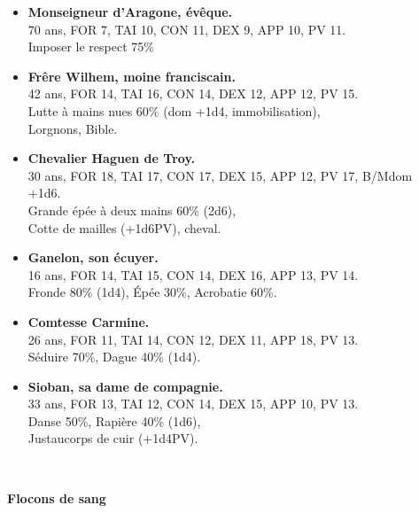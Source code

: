 \documentclass[11pt,twoside,a4paper]{book}
\begin{document}
\setlength\parindent{20pt}
\begin{itemize}
	\item \textbf{Monseigneur d'Aragone, {\'e}v{\^e}que.}~\\
		70 ans, FOR 7, TAI 10, CON 11, DEX 9, APP 10, PV 11.~\\
		Imposer le respect 75\%
	\item \textbf{Fr{\^e}re Wilhem, moine franciscain.}~\\
		42 ans, FOR 14, TAI 16, CON 14, DEX 12, APP 12, PV 15.~\\
		Lutte {\`a} mains nues 60\% (dom +1d4, immobilisation),~\\
		Lorgnons, Bible.
	\item \textbf{Chevalier Haguen de Troy.}~\\
		30 ans, FOR 18, TAI 17, CON 17, DEX 15, APP 12, PV 17, B/Mdom +1d6.~\\
		Grande {\'e}p{\'e}e {\`a} deux mains 60\% (2d6),~\\
		Cotte de mailles (+1d6PV), cheval.
	\item \textbf{Ganelon, son {\'e}cuyer.}~\\
		16 ans, FOR 14, TAI 15, CON 14, DEX 16, APP 13, PV 14.~\\
		Fronde 80\% (1d4), {\'E}p{\'e}e 30\%, Acrobatie 60\%. 
	\item \textbf{Comtesse Carmine.}~\\
		26 ans, FOR 11, TAI 14, CON 12, DEX 11, APP 18, PV 13.~\\
		S{\'e}duire 70\%, Dague 40\% (1d4).
	\item \textbf{Sioban, sa dame de compagnie.}~\\
		33 ans, FOR 13, TAI 12, CON 14, DEX 15, APP 10, PV 13.~\\
		Danse 50\%, Rapi{\`e}re 40\% (1d6),~\\
		Justaucorps de cuir (+1d4PV).
\end{itemize}~\\
\setlength\parindent{0pt}

\textbf{\large Flocons de sang}~\\
\end{document}
